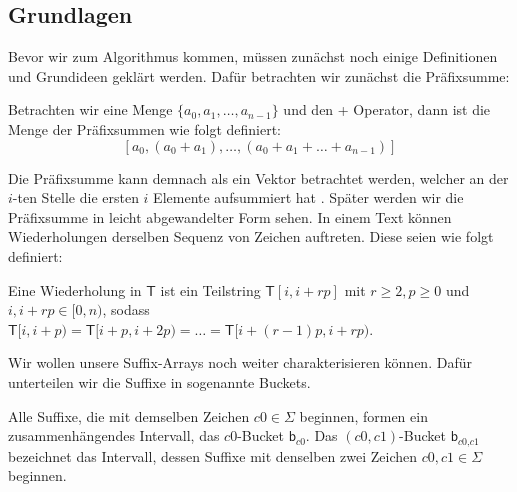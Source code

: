 \subsection{Grundlagen}
Bevor wir zum Algorithmus kommen, müssen zunächst noch einige Definitionen und Grundideen geklärt werden. Dafür betrachten wir zunächst die Präfixsumme:

\begin{definition}
	Betrachten wir eine Menge $\{a_0, a_1, \dots , a_{n-1}\}$ und den + Operator, dann ist die Menge der Präfixsummen wie folgt definiert:
	$$
	[a_0, (a_0 + a_1), \dots , (a_0 + a_1 + \dots + a_{n-1})]
	$$
\end{definition}
Die Präfixsumme kann demnach als ein Vektor betrachtet werden, welcher an der $i$-ten Stelle die ersten $i$ Elemente aufsummiert hat \cite{Blelloch90}. Später werden wir die Präfixsumme in leicht abgewandelter Form sehen.
\iffalse
In einem Text können Wiederholungen derselben Sequenz von Zeichen auftreten. Diese seien wie folgt definiert:
\begin{definition}
	\label{repetition}
	Eine Wiederholung in $\mathsf{T}$ ist ein Teilstring $\mathsf{T}[i, i + rp]$ mit $ r \geq 2, p \geq 0$ und $i, i + rp \in [0, n)$, sodass $\mathsf{T}[i, i+p) = \mathsf{T}[i + p, i + 2p) = \dots = \mathsf{T}[i + (r-1)p, i + rp)$.
\end{definition}

Wir wollen unsere Suffix-Arrays noch weiter charakterisieren können. Dafür unterteilen wir die Suffixe in sogenannte Buckets.

\begin{definition}
	Alle Suffixe, die mit demselben Zeichen $c0 \in \Sigma$ beginnen, formen ein zusammenhängendes Intervall, das $c0$-Bucket $\mathsf{b}_{\textit{c0}}$. Das $(c0,c1)$-Bucket $\mathsf{b}_{\textit{c0,c1}}$ bezeichnet das Intervall, dessen Suffixe mit denselben zwei Zeichen $c0,c1 \in \Sigma$ beginnen.
\end{definition}


